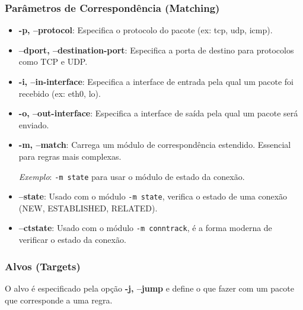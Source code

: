 ﻿\documentclass[12pt,fleqn]{article}
\begin{document}
\subsubsection{Parâmetros de Correspondência (Matching)}

\begin{itemize}
    \item \textbf{-p, --protocol}: Especifica o protocolo do pacote (ex: tcp, udp, icmp).
    
    \item \textbf{--dport, --destination-port}: Especifica a porta de destino para protocolos como TCP e UDP.
    
    \item \textbf{-i, --in-interface}: Especifica a interface de entrada pela qual um pacote foi recebido (ex: eth0, lo).
    
    \item \textbf{-o, --out-interface}: Especifica a interface de saída pela qual um pacote será enviado.
    
    \item \textbf{-m, --match}: Carrega um módulo de correspondência estendido. Essencial para regras mais complexas.
    
    \textit{Exemplo}: \texttt{-m state} para usar o módulo de estado da conexão.
    
    \item \textbf{--state}: Usado com o módulo \texttt{-m state}, verifica o estado de uma conexão (NEW, ESTABLISHED, RELATED).
    
    \item \textbf{--ctstate}: Usado com o módulo \texttt{-m conntrack}, é a forma moderna de verificar o estado da conexão.
\end{itemize}

\subsubsection{Alvos (Targets)}

O alvo é especificado pela opção \textbf{-j, --jump} e define o que fazer com um pacote que corresponde a uma regra.
\end{document}
